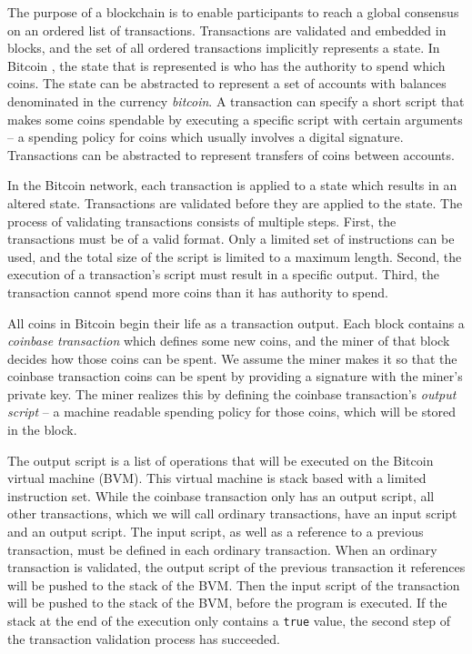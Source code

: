 The purpose of a blockchain is to enable participants to reach a global consensus on an ordered list of transactions. Transactions are validated and embedded in blocks, and the set of all ordered transactions implicitly represents a state. In Bitcoin \cite{bitcoinwhitepaper}, the state that is represented is who has the authority to spend which coins. The state can be abstracted to represent a set of accounts with balances denominated in the currency \emph{bitcoin}. A transaction can specify a short script that makes some coins spendable by executing a specific script with certain arguments – a spending policy for coins which usually involves a digital signature. Transactions can be abstracted to represent transfers of coins between accounts.

In the Bitcoin network, each transaction is applied to a state which results in an altered state. Transactions are validated before they are applied to the state. The process of validating transactions consists of multiple steps. First, the transactions must be of a valid format. Only a limited set of instructions can be used, and the total size of the script is limited to a maximum length. Second, the execution of a transaction's script must result in a specific output. Third, the transaction cannot spend more coins than it has authority to spend.

All coins in Bitcoin begin their life as a transaction output. Each block contains a \emph{coinbase transaction} which defines some new coins, and the miner of that block decides how those coins can be spent. We assume the miner makes it so that the coinbase transaction coins can be spent by providing a signature with the miner's private key. The miner realizes this by defining the coinbase transaction's \emph{output script} – a machine readable spending policy for those coins, which will be stored in the block. 

The output script is a list of operations that will be executed on the Bitcoin virtual machine (BVM). This virtual machine is stack based with a limited instruction set. While the coinbase transaction only has an output script, all other transactions, which we will call ordinary transactions, have an input script and an output script. The input script, as well as a reference to a previous transaction, must be defined in each ordinary transaction. When an ordinary transaction is validated, the output script of the previous transaction it references will be pushed to the stack of the BVM. Then the input script of the transaction will be pushed to the stack of the BVM, before the program is executed. If the stack at the end of the execution only contains a \texttt{true} value, the second step of the transaction validation process has succeeded. 

